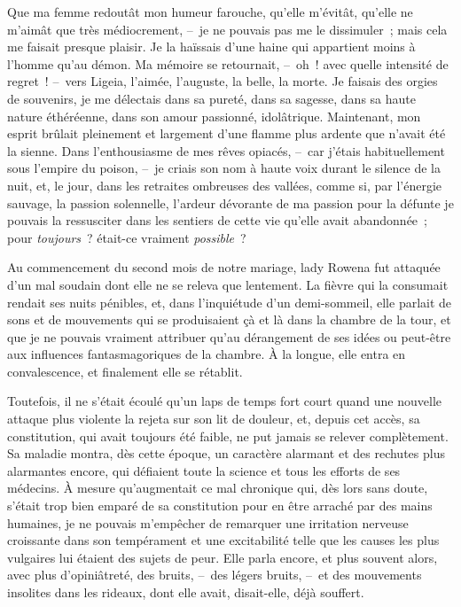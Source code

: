\documentclass[french,twoside]{book} %
\begin{document}
Que ma femme redoutât mon humeur farouche, qu’elle m’évitât, qu’elle ne m’aimât que très médiocrement, – je ne pouvais pas me le dissimuler ; mais cela me faisait presque plaisir. Je la haïssais d’une haine qui appartient moins à l’homme qu’au démon. Ma mémoire se retournait, – oh ! avec quelle intensité de regret ! – vers Ligeia, l’aimée, l’auguste, la belle, la morte. Je faisais des orgies de souvenirs, je me délectais dans sa pureté, dans sa sagesse, dans sa haute nature éthéréenne, dans son amour passionné, idolâtrique. Maintenant, mon esprit brûlait pleinement et largement d’une flamme plus ardente que n’avait été la sienne. Dans l’enthousiasme de mes rêves opiacés, – car j’étais habituellement sous l’empire du poison, – je criais son nom à haute voix durant le silence de la nuit, et, le jour, dans les retraites ombreuses des vallées, comme si, par l’énergie sauvage, la passion solennelle, l’ardeur dévorante de ma passion pour la défunte je pouvais la ressusciter dans les sentiers de cette vie qu’elle avait abandonnée ; pour \emph{toujours} ? était-ce vraiment \emph{possible} ?\par
Au commencement du second mois de notre mariage, lady Rowena fut attaquée d’un mal soudain dont elle ne se releva que lentement. La fièvre qui la consumait rendait ses nuits pénibles, et, dans l’inquiétude d’un demi-sommeil, elle parlait de sons et de mouvements qui se produisaient çà et là dans la chambre de la tour, et que je ne pouvais vraiment attribuer qu’au dérangement de ses idées ou peut-être aux influences fantasmagoriques de la chambre. À la longue, elle entra en convalescence, et finalement elle se rétablit.\par
Toutefois, il ne s’était écoulé qu’un laps de temps fort court quand une nouvelle attaque plus violente la rejeta sur son lit de douleur, et, depuis cet accès, sa constitution, qui avait toujours été faible, ne put jamais se relever complètement. Sa maladie montra, dès cette époque, un caractère alarmant et des rechutes plus alarmantes encore, qui défiaient toute la science et tous les efforts de ses médecins. À mesure qu’augmentait ce mal chronique qui, dès lors sans doute, s’était trop bien emparé de sa constitution pour en être arraché par des mains humaines, je ne pouvais m’empêcher de remarquer une irritation nerveuse croissante dans son tempérament et une excitabilité telle que les causes les plus vulgaires lui étaient des sujets de peur. Elle parla encore, et plus souvent alors, avec plus d’opiniâtreté, des bruits, – des légers bruits, – et des mouvements insolites dans les rideaux, dont elle avait, disait-elle, déjà souffert.\par
\end{document}
